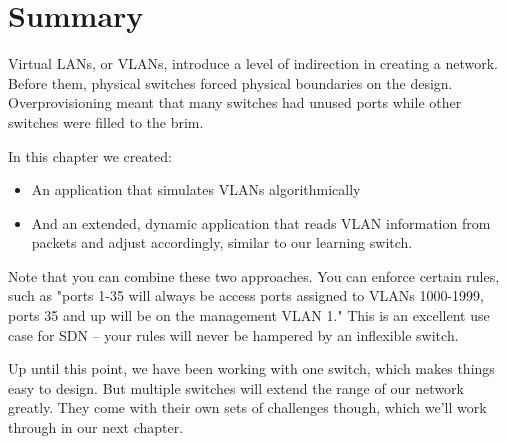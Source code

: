 \section{Summary}

Virtual LANs, or VLANs, introduce a level of indirection in creating a network.  Before them, physical
switches forced physical boundaries on the design.  Overprovisioning meant that many switches had
unused ports while other switches were filled to the brim.  

In this chapter we created:

\begin{itemize}
\item An application that simulates VLANs algorithmically
\item And an extended, dynamic application that reads VLAN information from packets and adjust accordingly, 
similar to our learning switch.
\end{itemize}

Note that you can combine these two approaches.  You can enforce certain rules, such as "ports 1-35 will always
be access ports assigned to VLANs 1000-1999, ports 35 and up will be on the management VLAN 1."  This is an
excellent use case for SDN -- your rules will never be hampered by an inflexible switch.

Up until this point, we have been working with one switch, which makes things easy to design.  But multiple
switches will extend the range of our network greatly.  They come with their own sets of challenges though,
which we'll work through in our next chapter.  